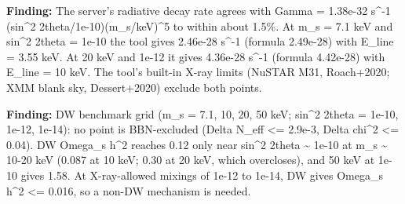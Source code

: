 \documentclass[11pt,a4paper]{article}
\begin{document}
\textbf{Finding:} The server's radiative decay rate agrees with Gamma = 1.38e-32 s\textasciicircum{}-1 (sin\textasciicircum{}2 2theta/1e-10)(m\_s/keV)\textasciicircum{}5 to within about 1.5\%. At m\_s = 7.1 keV and sin\textasciicircum{}2 2theta = 1e-10 the tool gives 2.46e-28 s\textasciicircum{}-1 (formula 2.49e-28) with E\_line = 3.55 keV. At 20 keV and 1e-12 it gives 4.36e-28 s\textasciicircum{}-1 (formula 4.42e-28) with E\_line = 10 keV. The tool's built-in X-ray limits (NuSTAR M31, Roach+2020; XMM blank sky, Dessert+2020) exclude both points.

\textbf{Finding:} DW benchmark grid (m\_s = 7.1, 10, 20, 50 keV; sin\textasciicircum{}2 2theta = 1e-10, 1e-12, 1e-14): no point is BBN-excluded (Delta N\_eff \textless{}= 2.9e-3, \textbar{}Delta chi\textasciicircum{}2\textbar{} \textless{}= 0.04). DW Omega\_s h\textasciicircum{}2 reaches 0.12 only near sin\textasciicircum{}2 2theta \textasciitilde{} 1e-10 at m\_s \textasciitilde{} 10-20 keV (0.087 at 10 keV; 0.30 at 20 keV, which overcloses), and 50 keV at 1e-10 gives 1.58. At X-ray-allowed mixings of 1e-12 to 1e-14, DW gives Omega\_s h\textasciicircum{}2 \textless{}= 0.016, so a non-DW mechanism is needed.
\end{document}
